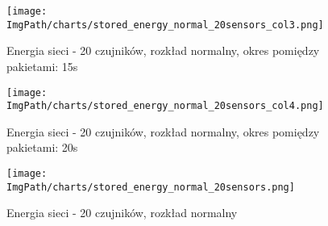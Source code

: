 \begin{figure}[!htbp]
	\begin{center}
		\texttt{[image: \\ImgPath/charts/stored\_energy\_normal\_20sensors\_col3.png]}
	\end{center}
	\caption{Energia sieci - 20 czujników, rozkład normalny, okres pomiędzy pakietami: 15s}
\end{figure}

\begin{figure}[!htbp]
	\begin{center}
		\texttt{[image: \\ImgPath/charts/stored\_energy\_normal\_20sensors\_col4.png]}
	\end{center}
	\caption{Energia sieci - 20 czujników, rozkład normalny, okres pomiędzy pakietami: 20s}
\end{figure}

\begin{figure}[!htbp]
	\begin{center}
		\texttt{[image: \\ImgPath/charts/stored\_energy\_normal\_20sensors.png]}
	\end{center}
	\caption{Energia sieci - 20 czujników, rozkład normalny}
\end{figure}